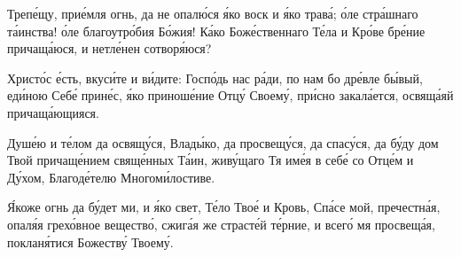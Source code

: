 \begin{mymulticols}
 Треп\'{е}щу, при\'{е}мля огнь, да не опал\'{ю}ся \'{я}ко воск и \'{я}ко трав\'{а}; \'{о}ле стр\'{а}шнаго т\'{а}инства! \'{о}ле благоутр\'{о}бия Б\'{о}жия! К\'{а}ко Бож\'{е}ственнаго Т\'{е}ла и Кр\'{о}ве бр\'{е}ние причащ\'{а}юся, и нетл\'{е}нен сотвор\'{я}юся?




Христ\'{о}с \'{е}сть, вкус\'{и}те и в\'{и}дите: Госп\'{о}дь нас р\'{а}ди, по нам бо др\'{е}вле б\'{ы}вый, ед\'{и}ною Себ\'{е} прин\'{е}с, \'{я}ко принош\'{е}ние Отц\'{у} Своем\'{у}, пр\'{и}сно закал\'{а}ется, освящ\'{а}яй причащ\'{а}ющияся.


Душ\'{е}ю и т\'{е}лом да освящ\'{у}ся, Влад\'{ы}ко, да просвещ\'{у}ся, да спас\'{у}ся, да б\'{у}ду дом Твой причащ\'{е}нием свящ\'{е}нных Т\'{а}ин, жив\'{у}щаго Тя им\'{е}я в себ\'{е} со Отц\'{е}м и Д\'{у}хом, Благод\'{е}телю Многом\'{и}лостиве.


\'{Я}коже огнь да б\'{у}дет ми, и \'{я}ко свет, Т\'{е}ло Тво\'{е} и Кровь, Сп\'{а}се мой, пречестн\'{а}я, опал\'{я}я грех\'{о}вное веществ\'{о}, сжиг\'{а}я же страст\'{е}й т\'{е}рние, и всег\'{о} мя просвещ\'{а}я, поклан\'{я}тися Божеств\'{у} Твоем\'{у}.




\Chestneyshuyu

\TrisviatoePoOtcheNash



\end{mymulticols}
